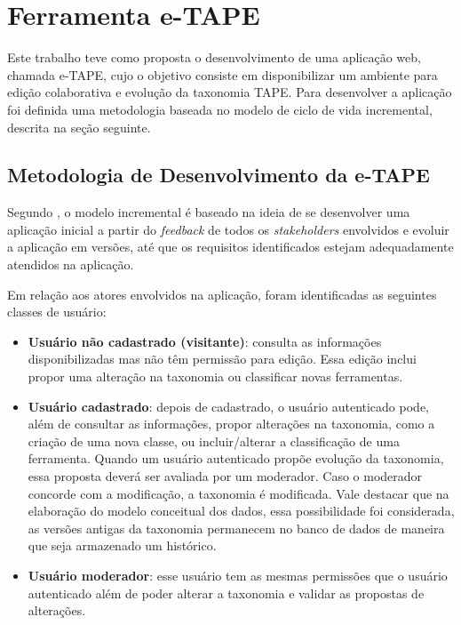 \chapter[Ferramenta]{Ferramenta e-TAPE}
\label{cap:cap3}
Este trabalho teve como proposta o desenvolvimento de uma aplicação web, chamada e-TAPE, cujo o objetivo consiste em disponibilizar um ambiente para edição colaborativa e evolução da taxonomia TAPE.
Para desenvolver a aplicação foi definida uma metodologia baseada no modelo de ciclo de vida incremental, descrita na seção seguinte.

\section {Metodologia de Desenvolvimento da e-TAPE}
\label{sec:desenvolvimento}
\par
Segundo , o modelo incremental é baseado na ideia de se desenvolver uma aplicação inicial a partir do \textit{feedback} de todos os \textit{stakeholders} envolvidos e evoluir a aplicação em versões, até que os requisitos identificados estejam adequadamente atendidos na aplicação. 

\par
Em relação aos atores envolvidos na aplicação, foram identificadas as seguintes classes de usuário:
\begin{itemize}
    \item \textbf{Usuário não cadastrado (visitante)}: consulta as informações disponibilizadas mas não têm permissão para edição. Essa edição inclui propor uma alteração na taxonomia ou classificar novas ferramentas.
    \item \textbf{Usuário cadastrado}: depois de cadastrado, o usuário autenticado pode, além de consultar as informações, propor alterações na taxonomia,  como a criação de uma nova classe, ou incluir/alterar a
    classificação de uma ferramenta. Quando um usuário autenticado propõe evolução da taxonomia, essa proposta deverá ser avaliada por um moderador. Caso o moderador concorde com a modificação,  a taxonomia é modificada. Vale destacar que na elaboração do modelo conceitual dos dados, essa possibilidade foi considerada, as versões antigas da taxonomia permanecem no banco de dados de maneira que seja armazenado
    um histórico. 
    \item \textbf{Usuário moderador}: esse usuário tem as mesmas permissões que o usuário autenticado além de poder alterar a taxonomia e validar as propostas de alterações. 
\end{itemize}

